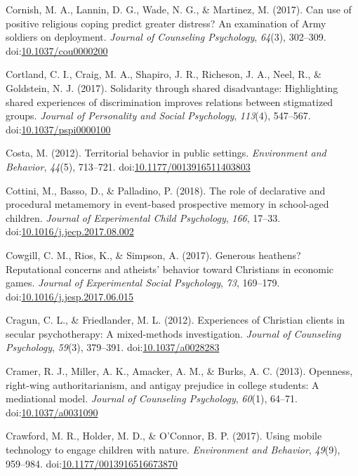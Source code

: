 \documentclass[english,man]{apa6}
\theoremstyle{definition}
\theoremstyle{definition}
\theoremstyle{definition}
\theoremstyle{remark}
\begin{document}
\hypertarget{ref-Cornish2017}{}
Cornish, M. A., Lannin, D. G., Wade, N. G., \& Martinez, M. (2017). Can
use of positive religious coping predict greater distress? An
examination of Army soldiers on deployment. \emph{Journal of Counseling
Psychology}, \emph{64}(3), 302--309.
doi:\href{https://doi.org/10.1037/cou0000200}{10.1037/cou0000200}

\hypertarget{ref-Cortland2017}{}
Cortland, C. I., Craig, M. A., Shapiro, J. R., Richeson, J. A., Neel,
R., \& Goldstein, N. J. (2017). Solidarity through shared disadvantage:
Highlighting shared experiences of discrimination improves relations
between stigmatized groups. \emph{Journal of Personality and Social
Psychology}, \emph{113}(4), 547--567.
doi:\href{https://doi.org/10.1037/pspi0000100}{10.1037/pspi0000100}

\hypertarget{ref-Costa2012}{}
Costa, M. (2012). Territorial behavior in public settings.
\emph{Environment and Behavior}, \emph{44}(5), 713--721.
doi:\href{https://doi.org/10.1177/0013916511403803}{10.1177/0013916511403803}

\hypertarget{ref-Cottini2018}{}
Cottini, M., Basso, D., \& Palladino, P. (2018). The role of declarative
and procedural metamemory in event-based prospective memory in
school-aged children. \emph{Journal of Experimental Child Psychology},
\emph{166}, 17--33.
doi:\href{https://doi.org/10.1016/j.jecp.2017.08.002}{10.1016/j.jecp.2017.08.002}

\hypertarget{ref-Cowgill2017}{}
Cowgill, C. M., Rios, K., \& Simpson, A. (2017). Generous heathens?
Reputational concerns and atheists' behavior toward Christians in
economic games. \emph{Journal of Experimental Social Psychology},
\emph{73}, 169--179.
doi:\href{https://doi.org/10.1016/j.jesp.2017.06.015}{10.1016/j.jesp.2017.06.015}

\hypertarget{ref-Cragun2012}{}
Cragun, C. L., \& Friedlander, M. L. (2012). Experiences of Christian
clients in secular psychotherapy: A mixed-methods investigation.
\emph{Journal of Counseling Psychology}, \emph{59}(3), 379--391.
doi:\href{https://doi.org/10.1037/a0028283}{10.1037/a0028283}

\hypertarget{ref-Cramer2013}{}
Cramer, R. J., Miller, A. K., Amacker, A. M., \& Burks, A. C. (2013).
Openness, right-wing authoritarianism, and antigay prejudice in college
students: A mediational model. \emph{Journal of Counseling Psychology},
\emph{60}(1), 64--71.
doi:\href{https://doi.org/10.1037/a0031090}{10.1037/a0031090}

\hypertarget{ref-Crawford2017}{}
Crawford, M. R., Holder, M. D., \& O'Connor, B. P. (2017). Using mobile
technology to engage children with nature. \emph{Environment and
Behavior}, \emph{49}(9), 959--984.
doi:\href{https://doi.org/10.1177/0013916516673870}{10.1177/0013916516673870}
\end{document}

